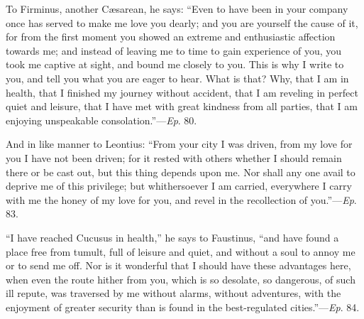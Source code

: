To Firminus, another Cæsarean, he says: ``Even to have been in
your company once has served to make me love you dearly; and you are
yourself the cause of it, for from the first moment you showed an
extreme and enthusiastic affection towards me; and instead of leaving
me to time to gain experience of you, you took me captive at sight,
and bound me closely to you. This is why I write to you, and tell you
what you are eager to hear. What is that? Why, that I am in health,
that I finished my journey without accident, that I am reveling in
perfect quiet and leisure, that I have met with great kindness from
all parties, that I am enjoying unspeakable consolation.''—\emph{Ep}.
80.

And in like manner to Leontius: ``From your city I was driven,
from my love for you I have not been driven; for it rested with others
whether I should remain there or be cast out, but this thing depends
upon me. Nor shall any one avail to deprive me of this privilege; but
whithersoever I am carried, everywhere I carry with me the honey of my
love for you, and revel in the recollection of you.''—\emph{Ep}.
83.

``I have reached Cucusus in health,'' he says to Faustinus,
``and have found a place free from tumult, full of leisure and
quiet, and without a soul to annoy me or to send me off. Nor is
it wonderful that I should have these advantages here, when even the
route hither from you, which is so desolate, so dangerous, of such ill
repute, was traversed by me without alarms, without adventures, with
the enjoyment of greater security than is found in the best-regulated
cities.''—\emph{Ep}. 84.

